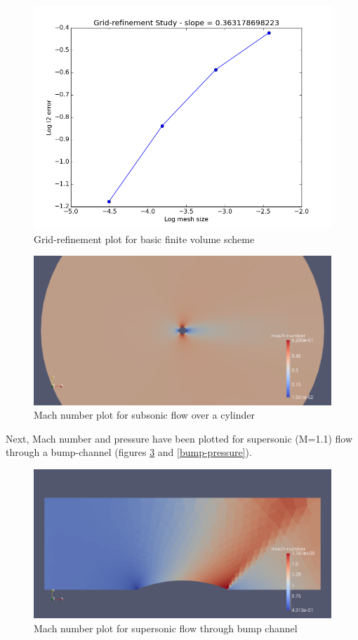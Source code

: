 \documentclass[letterpaper,twoside,12pt]{article}
\begin{document}
\begin{figure}[!H]
	\centering
	\includegraphics[scale=.5]{convergence-FV}
	\caption{Grid-refinement plot for basic finite volume scheme}
	\label{order}
\end{figure}

\begin{figure}[!H]
\centering
\includegraphics[scale=.25]{cyl-fine-2}
\caption{Mach number plot for subsonic flow over a cylinder}
\label{cyl-mach}
\end{figure}

Next, Mach number and pressure have been plotted for supersonic (M=1.1) flow through a bump-channel (figures \ref{bump-mach} and \ref{bump-pressure}).

\begin{figure}[!H]
\centering
\includegraphics[scale=.25]{bump-2-mach}
\caption{Mach number plot for supersonic flow through bump channel}
\label{bump-mach}
\end{figure}
\end{document}
